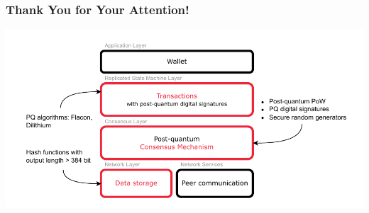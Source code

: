 

\begin{frame}
    \frametitle{Thank You for Your Attention!}
    \centering
    \includegraphics[width=\textwidth]{img/final.pdf}
\end{frame}





